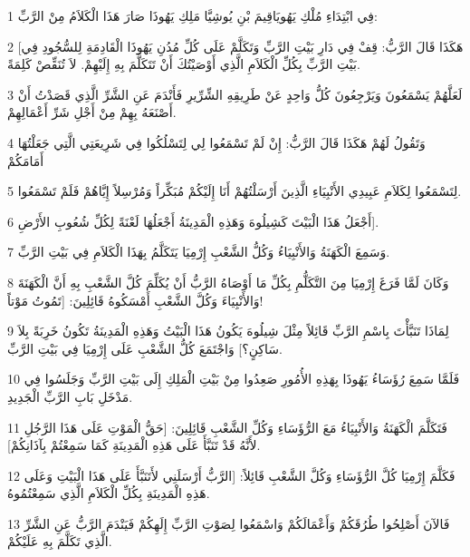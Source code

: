 \par 1 فِي ابْتِدَاءِ مُلْكِ يَهُويَاقِيمَ بْنِ يُوشِيَّا مَلِكِ يَهُوذَا صَارَ هَذَا الْكَلاَمُ مِنْ الرَّبِّ:
\par 2 [هَكَذَا قَالَ الرَّبُّ: قِفْ فِي دَارِ بَيْتِ الرَّبِّ وَتَكَلَّمْ عَلَى كُلِّ مُدُنِ يَهُوذَا الْقَادِمَةِ لِلسُّجُودِ فِي بَيْتِ الرَّبِّ بِكُلِّ الْكَلاَمِ الَّذِي أَوْصَيْتُكَ أَنْ تَتَكَلَّمَ بِهِ إِلَيْهِمْ. لاَ تُنَقِّصْ كَلِمَةً.
\par 3 لَعَلَّهُمْ يَسْمَعُونَ وَيَرْجِعُونَ كُلُّ وَاحِدٍ عَنْ طَرِيقِهِ الشِّرِّيرِ فَأَنْدَمَ عَنِ الشَّرِّ الَّذِي قَصَدْتُ أَنْ أَصْنَعَهُ بِهِمْ مِنْ أَجْلِ شَرِّ أَعْمَالِهِمْ.
\par 4 وَتَقُولُ لَهُمْ هَكَذَا قَالَ الرَّبُّ: إِنْ لَمْ تَسْمَعُوا لِي لِتَسْلُكُوا فِي شَرِيعَتِي الَّتِي جَعَلْتُهَا أَمَامَكُمْ
\par 5 لِتَسْمَعُوا لِكَلاَمِ عَبِيدِي الأَنْبِيَاءِ الَّذِينَ أَرْسَلْتُهُمْ أَنَا إِلَيْكُمْ مُبَكِّراً وَمُرْسِلاً إِيَّاهُمْ فَلَمْ تَسْمَعُوا.
\par 6 أَجْعَلُ هَذَا الْبَيْتَ كَشِيلُوهَ وَهَذِهِ الْمَدِينَةُ أَجْعَلُهَا لَعْنَةً لِكُلِّ شُعُوبِ الأَرْضِ].
\par 7 وَسَمِعَ الْكَهَنَةُ وَالأَنْبِيَاءُ وَكُلُّ الشَّعْبِ إِرْمِيَا يَتَكَلَّمُ بِهَذَا الْكَلاَمِ فِي بَيْتِ الرَّبِّ.
\par 8 وَكَانَ لَمَّا فَرَغَ إِرْمِيَا مِنَ التَّكَلُّمِ بِكُلِّ مَا أَوْصَاهُ الرَّبُّ أَنْ يُكَلِّمَ كُلَّ الشَّعْبِ بِهِ أَنَّ الْكَهَنَةَ وَالأَنْبِيَاءَ وَكُلَّ الشَّعْبِ أَمْسَكُوهُ قَائِلِينَ: [تَمُوتُ مَوْتاً!
\par 9 لِمَاذَا تَنَبَّأْتَ بِاسْمِ الرَّبِّ قَائِلاً مِثْلَ شِيلُوهَ يَكُونُ هَذَا الْبَيْتُ وَهَذِهِ الْمَدِينَةُ تَكُونُ خَرِبَةً بِلاَ سَاكِنٍ؟] وَاجْتَمَعَ كُلُّ الشَّعْبِ عَلَى إِرْمِيَا فِي بَيْتِ الرَّبِّ.
\par 10 فَلَمَّا سَمِعَ رُؤَسَاءُ يَهُوذَا بِهَذِهِ الأُمُورِ صَعِدُوا مِنْ بَيْتِ الْمَلِكِ إِلَى بَيْتِ الرَّبِّ وَجَلَسُوا فِي مَدْخَلِ بَابِ الرَّبِّ الْجَدِيدِ.
\par 11 فَتَكَلَّمَ الْكَهَنَةُ وَالأَنْبِيَاءُ مَعَ الرُّؤَسَاءِ وَكُلِّ الشَّعْبِ قَائِلِينَ: [حَقُّ الْمَوْتِ عَلَى هَذَا الرَّجُلِ لأَنَّهُ قَدْ تَنَبَّأَ عَلَى هَذِهِ الْمَدِينَةِ كَمَا سَمِعْتُمْ بِآذَانِكُمْ].
\par 12 فَكَلَّمَ إِرْمِيَا كُلَّ الرُّؤَسَاءِ وَكُلَّ الشَّعْبِ قَائِلاً: [الرَّبُّ أَرْسَلَنِي لأَتَنَبَّأَ عَلَى هَذَا الْبَيْتِ وَعَلَى هَذِهِ الْمَدِينَةِ بِكُلِّ الْكَلاَمِ الَّذِي سَمِعْتُمُوهُ.
\par 13 فَالآنَ أَصْلِحُوا طُرُقَكُمْ وَأَعْمَالَكُمْ وَاسْمَعُوا لِصَوْتِ الرَّبِّ إِلَهِكُمْ فَيَنْدَمَ الرَّبُّ عَنِ الشَّرِّ الَّذِي تَكَلَّمَ بِهِ عَلَيْكُمْ.
